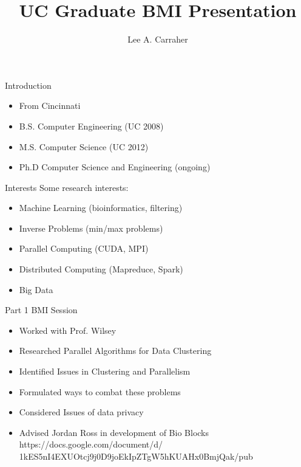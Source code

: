 \documentclass{beamer}
\title[Graduate Seminar]{UC Graduate BMI Presentation}
\author[Lee Carraher]{\textsf{Lee A. Carraher}}
\institute[Univ. of Cincinnati]{
  School of Electronic and Computing Systems \\
  University of Cincinnati \\
}
\begin{document}
\begin{frame}[plain]
  \titlepage
\end{frame}



\begin{frame}{Introduction}
\begin{itemize}
\item From Cincinnati
\item B.S. Computer Engineering (UC 2008)
\item M.S. Computer Science (UC 2012)
\item Ph.D Computer Science and Engineering (ongoing)
\end{itemize}
\end{frame}


\begin{frame}{Interests}
Some research interests:
\begin{itemize}
\item Machine Learning (bioinformatics, filtering)
\item Inverse Problems (min/max problems)
\item Parallel Computing (CUDA, MPI)
\item Distributed Computing (Mapreduce, Spark)
\item Big Data
\end{itemize}
\end{frame}

\begin{frame}{Part 1 BMI Session}
\begin{itemize}
 \item Worked with Prof. Wilsey
 \item Researched Parallel Algorithms for Data Clustering
 \item Identified Issues in Clustering and Parallelism
 \item Formulated ways to combat these problems
 \item Considered Issues of data privacy 
 \item Advised Jordan Ross in development of Bio Blocks https://docs.google.com/document/d/
 \\1kES5nI4EXUOtcj9j0D9joEkIpZTgW5hKUAHx0BmjQak/pub
\end{itemize}
 \end{frame}
 
\end{document}
